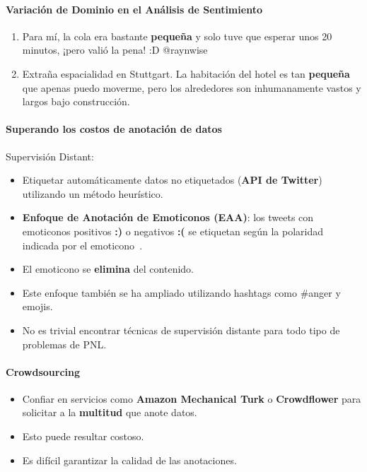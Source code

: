 \paragraph{Variación de Dominio en el Análisis de Sentimiento}
\begin{enumerate}
   \item Para mí, la cola era bastante \textcolor[rgb]{0.00,0.00,1.00}{\textbf{pequeña}} y solo tuve que esperar unos 20 minutos, ¡pero valió la pena! :D @raynwise
   \item Extraña espacialidad en Stuttgart. La habitación del hotel es tan \textcolor[rgb]{1.00,0.00,0.00}{\textbf{pequeña}} que apenas puedo moverme, pero los alrededores son inhumanamente vastos y largos bajo construcción.
\end{enumerate}

\paragraph{Superando los costos de anotación de datos}
Supervisión Distant:
\begin{itemize}
   \item Etiquetar automáticamente datos no etiquetados (\textbf{API de Twitter}) utilizando un método heurístico.
   \item \textbf{Enfoque de Anotación de Emoticonos (EAA)}: los tweets con emoticonos positivos \textcolor[rgb]{0.00,0.00,1.00}{\textbf{:)}} o negativos \textcolor[rgb]{1.00,0.00,0.00}{\textbf{:(}} se etiquetan según la polaridad indicada por el emoticono~\cite{Read2005}.
   \item El emoticono se \textbf{elimina} del contenido.
   \item Este enfoque también se ha ampliado utilizando hashtags como \#anger y emojis.
   \item No es trivial encontrar técnicas de supervisión distante para todo tipo de problemas de PNL.
\end{itemize}

\paragraph{Crowdsourcing}
\begin{itemize}
   \item Confiar en servicios como \textbf{Amazon Mechanical Turk} o \textbf{Crowdflower} para solicitar a la \textbf{multitud} que anote datos.
   \item Esto puede resultar costoso.
   \item Es difícil garantizar la calidad de las anotaciones.
\end{itemize}

